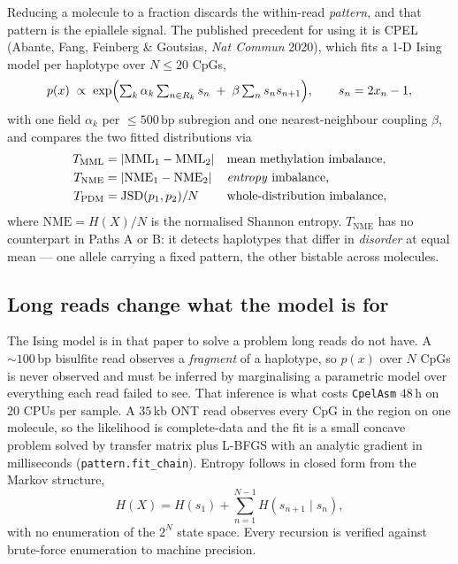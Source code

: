 \documentclass[11pt]{article}
\begin{document}
Reducing a molecule to a fraction discards the within-read \emph{pattern}, and
that pattern is the epiallele signal. The published precedent for using it is
CPEL (Abante, Fang, Feinberg \& Goutsias, \emph{Nat Commun} 2020), which fits a
1-D Ising model per haplotype over $N \le 20$ CpGs,
\begin{equation}
p(x) \;\propto\; \exp\Bigl(\textstyle\sum_k \alpha_k \sum_{n \in R_k} s_n
\;+\; \beta \sum_n s_n s_{n+1}\Bigr),
\qquad s_n = 2x_n - 1,
\end{equation}
with one field $\alpha_k$ per $\le\!500$\,bp subregion and one nearest-neighbour
coupling $\beta$, and compares the two fitted distributions via
\begin{align}
T_{\mathrm{MML}} &= |\mathrm{MML}_1 - \mathrm{MML}_2|
&& \text{mean methylation imbalance},\\
T_{\mathrm{NME}} &= |\mathrm{NME}_1 - \mathrm{NME}_2|
&& \text{\emph{entropy} imbalance},\\
T_{\mathrm{PDM}} &= \mathrm{JSD}(p_1, p_2)/N
&& \text{whole-distribution imbalance},
\end{align}
where $\mathrm{NME} = H(X)/N$ is the normalised Shannon entropy.
$T_{\mathrm{NME}}$ has no counterpart in Paths A or B: it detects haplotypes
that differ in \emph{disorder} at equal mean --- one allele carrying a fixed
pattern, the other bistable across molecules.

\subsection{Long reads change what the model is for}

The Ising model is in that paper to solve a problem long reads do not have. A
$\sim\!100$\,bp bisulfite read observes a \emph{fragment} of a haplotype, so
$p(x)$ over $N$ CpGs is never observed and must be inferred by marginalising a
parametric model over everything each read failed to see. That inference is what
costs \texttt{CpelAsm} $48$\,h on $20$ CPUs per sample. A $35$\,kb ONT read
observes every CpG in the region on one molecule, so the likelihood is
complete-data and the fit is a small concave problem solved by transfer matrix
plus L-BFGS with an analytic gradient in milliseconds
(\texttt{pattern.fit\_chain}). Entropy follows in closed form from the Markov
structure,
\begin{equation}
H(X) = H(s_1) + \sum_{n=1}^{N-1} H(s_{n+1} \mid s_n),
\end{equation}
with no enumeration of the $2^N$ state space. Every recursion is verified
against brute-force enumeration to machine precision.
\end{document}
